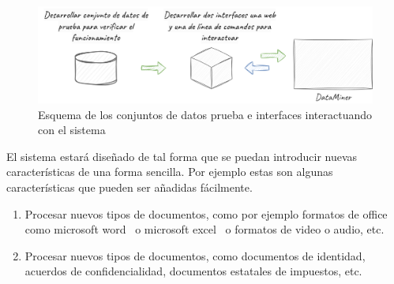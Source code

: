 \begin{figure}[ht]
    \begin{center}
        \includegraphics[width=\textwidth]{chapter/1/images/chapter_1.specific_b}
        \caption{Esquema de los conjuntos de datos prueba e interfaces interactuando con el sistema}
        \label{fig:chapter_1.specific_b}
    \end{center}
\end{figure}

El sistema estará diseñado de tal forma que se puedan introducir nuevas características de una forma sencilla.
Por ejemplo estas son algunas características que pueden ser añadidas fácilmente.

\begin{enumerate}
    \item
    Procesar nuevos tipos de documentos, como por ejemplo formatos de office como microsoft
    word~\cite{url_microsoft_word} o microsoft excel~\cite{url_microsoft_excel} o formatos de video o audio, etc.
    \item
    Procesar nuevos tipos de documentos, como documentos de identidad, acuerdos de confidencialidad, documentos
    estatales de impuestos, etc.
\end{enumerate}
